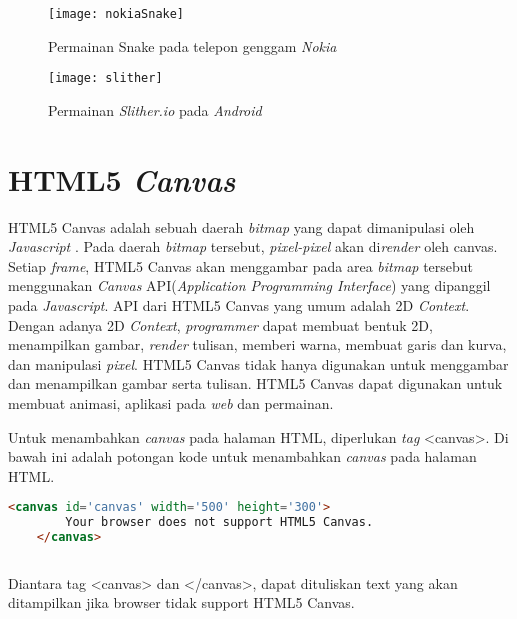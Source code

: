 \begin{figure}[H]
	\centering  
	\texttt{[image: nokiaSnake]}  
	\caption[Permainan Snake pada telepon genggam \textit{Nokia}]{Permainan Snake pada telepon genggam \textit{Nokia}} 
	\label{fig:nokiaSnake} 
\end{figure} 

\begin{figure}[H]
	\centering  
	\texttt{[image: slither]}  
	\caption[Permainan \textit{Slither.io} pada \textit{Android}]{Permainan \textit{Slither.io} pada \textit{Android}} 
	\label{fig:slither} 
\end{figure} 

\section{HTML5 \textit{Canvas}}
\label{sec:HTML5Canvas}
HTML5 Canvas adalah sebuah daerah \textit{bitmap} yang dapat dimanipulasi oleh \textit{Javascript} \cite{fulton2013html5}. Pada daerah \textit{bitmap} tersebut, \textit{pixel-pixel} akan di\textit{render} oleh canvas. Setiap \textit{frame}, HTML5 Canvas akan menggambar pada area \textit{bitmap} tersebut menggunakan \textit{Canvas} API(\textit{Application Programming Interface}) yang dipanggil pada \textit{Javascript}. API dari HTML5 Canvas yang umum adalah 2D \textit{Context}. Dengan adanya 2D \textit{Context}, \textit{programmer} dapat membuat bentuk 2D, menampilkan gambar, \textit{render} tulisan, memberi warna, membuat garis dan kurva, dan manipulasi \textit{pixel}. HTML5 Canvas tidak hanya digunakan untuk menggambar dan menampilkan gambar serta tulisan. HTML5 Canvas dapat digunakan untuk membuat animasi, aplikasi pada \textit{web} dan permainan. 

Untuk menambahkan \textit{canvas} pada halaman HTML, diperlukan \textit{tag} <canvas>. Di bawah ini adalah potongan kode untuk menambahkan \textit{canvas} pada halaman HTML. 

\begin{lstlisting}[language=HTML, caption=Menambahkan \textit{canvas}]
	<canvas id='canvas' width='500' height='300'>
		Your browser does not support HTML5 Canvas.
	</canvas>
	
\end{lstlisting}

Diantara tag <canvas> dan </canvas>, dapat dituliskan text yang akan ditampilkan jika browser tidak support HTML5 Canvas. 

